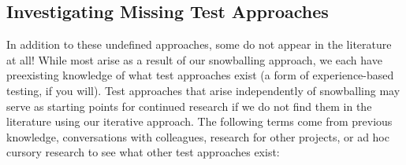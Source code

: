 
\clearpage
\subsection{Investigating Missing Test Approaches}\label{future-miss-terms}
In addition to these undefined approaches, some do not appear in
the literature at all! While most arise as a result of our
snowballing approach, we each have preexisting knowledge of what test
approaches exist (a form of experience-based testing, if you will).
Test approaches that arise independently of snowballing may
serve as starting points for continued research if we do not find them in
the literature using our iterative approach. The following terms come from
previous knowledge, conversations with colleagues, research for other
projects, or ad hoc cursory research to see what other test approaches exist:
\newline

